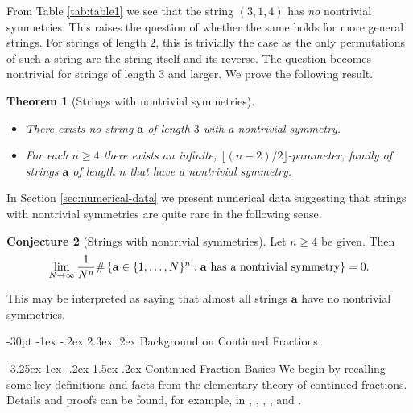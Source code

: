\documentclass[10pt]{article}
\makeatletter
\renewcommand\section{\@startsection {section}{1}{\z@}
{-30pt \@plus -1ex \@minus -.2ex}
{2.3ex \@plus.2ex}
{\normalfont\normalsize\bfseries\boldmath}}
\renewcommand\subsection{\@startsection{subsection}{2}{\z@}
{-3.25ex\@plus -1ex \@minus -.2ex}
{1.5ex \@plus .2ex}
{\normalfont\normalsize\bfseries\boldmath}}
\newtheorem{theorem}{Theorem}
\theoremstyle{definition}
\newtheorem{conjecture}[theorem]{Conjecture}
\numberwithin{equation}{section}
\numberwithin{lemma}{section}
\newcommand{\bfa}{\mathbf{a}}
\makeatother
\begin{document}
From Table \ref{tab:table1} we see that the string $(3,1,4)$ has \emph{no}
nontrivial symmetries. This raises the question of whether the same 
holds for more general strings.  For strings of length $2$, this is
trivially the case as the only permutations of such a string 
are the string itself and
its reverse.  The question becomes nontrivial for strings of length 
$3$ and larger.  We prove the following result. 

\begin{theorem}[Strings with nontrivial symmetries]
\label{thm:nontrivial-symmetries}
\mbox{}
\begin{itemize}
\item[(i)]
There exists no  string  $\bfa$ of length $3$
with a nontrivial symmetry.
\item[(ii)]
For each $n\ge 4$ there exists an infinite, 
$\lfloor (n-2)/2\rfloor$-parameter, family of strings 
$\bfa$ of length $n$ that have a nontrivial symmetry.
\end{itemize}
\end{theorem}

In Section \ref{sec:numerical-data} we present numerical data 
suggesting that strings with nontrivial symmetries are quite rare
in the following sense.

\begin{conjecture}[Strings with nontrivial symmetries]
\label{conj:nontrivial-symmetries}
Let $n\ge4$ be given. Then 
\begin{equation}
\notag
\lim_{N\to\infty}\frac1{N^n}\#\left\{\bfa\in \{1,\dots,N\}^n: 
\text{$\bfa$ has a nontrivial symmetry}\right\}=0.
\end{equation}
\end{conjecture}

This may be interpreted as saying that almost all strings $\bfa$ have
no nontrivial symmetries.

\section{Background on Continued Fractions}
\label{sec:background}

\subsection{Continued Fraction Basics}
We begin by recalling some key definitions and facts from the elementary
theory of continued fractions.  Details and proofs can be found, for
example,  in
\cite[Chapter 2]{neverending-fractions-book}, 
\cite[Section 1.3]{dajani-kraaikamp-book},
\cite[Chapter
9]{hardy-wright2008}, \cite[Chapters I--II]{khinchin-book}, and
\cite[Chapter 5]{niven1956}. 
\end{document}
